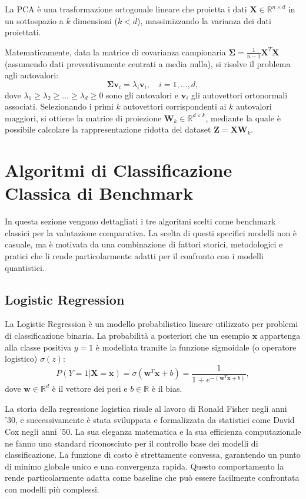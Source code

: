 La PCA è una trasformazione ortogonale lineare che proietta i dati $\mathbf{X} \in \mathbb{R}^{n \times d}$ in un sottospazio a $k$ dimensioni ($k < d$), massimizzando la varianza dei dati proiettati.

Matematicamente, data la matrice di covarianza campionaria $\boldsymbol{\Sigma} = \frac{1}{n-1} \mathbf{X}^T \mathbf{X}$ (assumendo dati preventivamente centrati a media nulla), si risolve il problema agli autovalori:
\begin{equation}
\boldsymbol{\Sigma} \mathbf{v}_i = \lambda_i \mathbf{v}_i, \quad i=1, \dots, d,
\end{equation}
dove $\lambda_1 \geq \lambda_2 \geq \dots \geq \lambda_d \geq 0$ sono gli autovalori e $\mathbf{v}_i$ gli autovettori ortonormali associati. Selezionando i primi $k$ autovettori corrispondenti ai $k$ autovalori maggiori, si ottiene la matrice di proiezione $\mathbf{W}_k \in \mathbb{R}^{d \times k}$, mediante la quale è possibile calcolare la rappresentazione ridotta del dataset $\mathbf{Z} = \mathbf{X} \mathbf{W}_k$.

\section{Algoritmi di Classificazione Classica di Benchmark}
In questa sezione vengono dettagliati i tre algoritmi scelti come benchmark classici per la valutazione comparativa. La scelta di questi specifici modelli non è casuale, ma è motivata da una combinazione di fattori storici, metodologici e pratici che li rende particolarmente adatti per il confronto con i modelli quantistici.

\subsection{Logistic Regression}
La Logistic Regression è un modello probabilistico lineare utilizzato per problemi di classificazione binaria. La probabilità a posteriori che un esempio $\mathbf{x}$ appartenga alla classe positiva $y=1$ è modellata tramite la funzione sigmoidale (o operatore logistico) $\sigma(z)$:
\begin{equation}
P(Y=1 | \mathbf{X}=\mathbf{x}) = \sigma(\mathbf{w}^T \mathbf{x} + b) = \frac{1}{1 + e^{-(\mathbf{w}^T \mathbf{x} + b)}},
\end{equation}
dove $\mathbf{w} \in \mathbb{R}^d$ è il vettore dei pesi e $b \in \mathbb{R}$ è il bias.

La storia della regressione logistica risale al lavoro di Ronald Fisher negli anni '30, e successivamente è stata sviluppata e formalizzata da statistici come David Cox negli anni '50. La sua eleganza matematica e la sua efficienza computazionale ne fanno uno standard riconosciuto per il controllo base dei modelli di classificazione. La funzione di costo è strettamente convessa, garantendo un punto di minimo globale unico e una convergenza rapida. Questo comportamento la rende particolarmente adatta come baseline che può essere facilmente confrontata con modelli più complessi.

